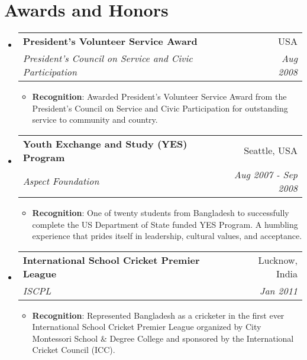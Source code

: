 \documentclass[letterpaper,11pt]{article}
\makeatletter
\newcommand{\resumeItem}[2]{
  \item\small{
    \textbf{#1}{: #2 \vspace{-2pt}}
  }
}
\newcommand{\resumeSubheading}[4]{
  \vspace{-1pt}\item
    \begin{tabular*}{0.97\textwidth}[t]{l@{\extracolsep{\fill}}r}
      \textbf{#1} & #2 \\
      \textit{\small#3} & \textit{\small #4} \\
    \end{tabular*}\vspace{-5pt}
}
\newcommand{\resumeSubHeadingListStart}{\begin{itemize}[leftmargin=*]}
\newcommand{\resumeSubHeadingListEnd}{\end{itemize}}
\newcommand{\resumeItemListStart}{\begin{itemize}}
\newcommand{\resumeItemListEnd}{\end{itemize}\vspace{-5pt}}
\makeatother
\begin{document}
\section{Awards and Honors}
  \resumeSubHeadingListStart
  \resumeSubheading
      {President's Volunteer Service Award}{USA}
      {President's Council on Service and Civic Participation}{Aug 2008}
      \resumeItemListStart
      	\resumeItem{Recognition}{Awarded President's Volunteer Service Award from the President's Council on Service and Civic Participation for outstanding service to community and country.}
      \resumeItemListEnd 
    \resumeSubheading
      {Youth Exchange and Study (YES) Program}{Seattle, USA}
      {Aspect Foundation}{Aug 2007 - Sep 2008}
      \resumeItemListStart
      	\resumeItem{Recognition}{One of twenty students from Bangladesh to successfully complete the US Department of State funded YES Program. A humbling experience that prides itself in leadership, cultural values, and acceptance.}
      \resumeItemListEnd 
           \resumeSubheading
      {International School Cricket Premier League}{Lucknow, India}
      {ISCPL}{Jan 2011 }
      \resumeItemListStart
      	\resumeItem{Recognition}{Represented Bangladesh as a cricketer in the first ever International School Cricket Premier League organized by City Montessori School \& Degree College and sponsored by the International Cricket Council (ICC).}
      \resumeItemListEnd 
  \resumeSubHeadingListEnd


\end{document}
